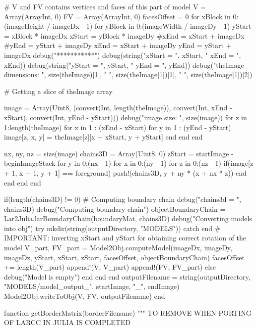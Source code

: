 \documentclass[11pt,oneside]{article}	%
\begin{document}
{  # V and FV contains vertices and faces of this part of model
  V = Array(Array{Int}, 0)
  FV = Array(Array{Int}, 0)
  facesOffset = 0
  for xBlock in 0:(imageHeight / imageDx - 1)
    for yBlock in 0:(imageWidth / imageDy - 1)
      yStart = xBlock * imageDx
      xStart = yBlock * imageDy
      #xEnd = xStart + imageDx
      #yEnd = yStart + imageDy
      xEnd = xStart + imageDy
      yEnd = yStart + imageDx
      debug("***********")
      debug(string("xStart = ", xStart, " xEnd = ", xEnd))
      debug(string("yStart = ", yStart, " yEnd = ", yEnd))
      debug("theImage dimensions: ", size(theImage)[1], " ", size(theImage[1])[1], " ", size(theImage[1])[2])

      # Getting a slice of theImage array

      image = Array(Uint8, (convert(Int, length(theImage)), convert(Int, xEnd - xStart), convert(Int, yEnd - yStart)))
      debug("image size: ", size(image))
      for z in 1:length(theImage)
        for x in 1 : (xEnd - xStart)
          for y in 1 : (yEnd - yStart)
            image[z, x, y] = theImage[z][x + xStart, y + yStart]
          end
        end
      end

      nx, ny, nz = size(image)
      chains3D = Array(Uint8, 0)
      zStart = startImage - beginImageStack
      for y in 0:(nx - 1)
        for x in 0:(ny - 1)
          for z in 0:(nz - 1)
            if(image[z + 1, x + 1, y + 1] == foreground)
              push!(chains3D, y + ny * (x + nx * z))
            end
          end
        end
      end

      if(length(chains3D) != 0)
        # Computing boundary chain
        debug("chains3d = ", chains3D)
        debug("Computing boundary chain")
        objectBoundaryChain = Lar2Julia.larBoundaryChain(boundaryMat, chains3D)
        debug("Converting models into obj")
        try
          mkdir(string(outputDirectory, "MODELS"))
        catch
        end
        # IMPORTANT: inverting xStart and yStart for obtaining correct rotation of the model
        V_part, FV_part = Model2Obj.computeModel(imageDx, imageDy, imageDz, yStart, xStart, zStart, facesOffset, objectBoundaryChain)
        facesOffset += length(V_part)
        append!(V, V_part)
        append!(FV, FV_part)
      else
        debug("Model is empty")
      end
    end
  end
  outputFilename = string(outputDirectory, "MODELS/model_output_", startImage, "_", endImage)
  Model2Obj.writeToObj(V, FV, outputFilename)
end

function getBorderMatrix(borderFilename)
  """
  TO REMOVE WHEN PORTING OF LARCC IN JULIA IS COMPLETED

}
\end{document}
